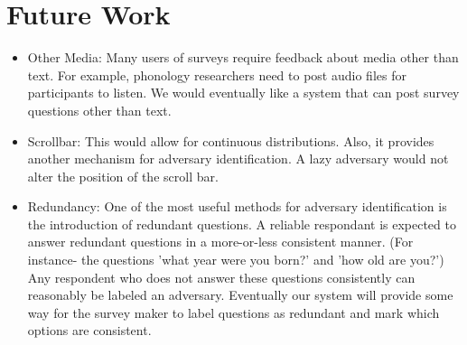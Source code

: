 \documentclass{article}
\begin{document}
\section{Future Work}
\begin{itemize}
\item Other Media:  Many users of surveys require feedback about media other than text. For example, phonology researchers need to post audio files for participants to listen. We would eventually like a system that can post survey questions other than text.
\item Scrollbar: This would allow for continuous distributions. Also, it provides another mechanism for adversary identification. A lazy adversary would not alter the position of the scroll bar.
\item Redundancy: One of the most useful methods for adversary identification is the introduction of redundant questions. A reliable respondant is expected to answer redundant questions in a more-or-less consistent manner. (For instance- the questions 'what year were you born?' and 'how old are you?') Any respondent who does not answer these questions consistently can reasonably be labeled an adversary. Eventually our system will provide some way for the survey maker to label questions as redundant and mark which options are consistent.
\end{itemize}


\end{document}

